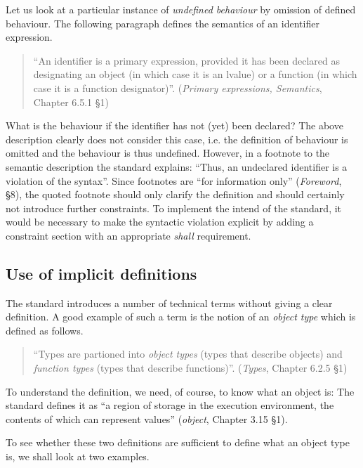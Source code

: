 \documentclass[12pt,a4paper,reqno]{article}
\theoremstyle{plain}
\theoremstyle{definition}
\begin{document}
Let us look at a particular instance of \textit{undefined behaviour} by omission of defined behaviour. The following paragraph defines the semantics of an identifier expression.
\begin{quote}
``An identifier is a primary expression, provided it has been declared as designating an object (in which case it is an lvalue) or a function (in which case it is a function designator)''. (\textit{Primary expressions, Semantics}, Chapter 6.5.1 §1)
\end{quote}
What is the behaviour if the identifier has not (yet) been declared? The above description clearly does not consider this case, i.e. the definition of behaviour is omitted and the behaviour is thus undefined. However, in a footnote to the semantic description the standard explains: ``Thus, an undeclared identifier is a violation of the syntax''. Since footnotes are ``for information only'' (\textit{Foreword}, §8), the quoted footnote should only clarify the definition and should certainly not introduce further constraints. To implement the intend of the standard, it would be necessary to make the syntactic violation explicit by adding a constraint section with an appropriate \textit{shall} requirement.

\subsection{Use of implicit definitions}
The standard introduces a number of technical terms without giving a clear definition. A good example of such a term is the notion of an \textit{object type} which is defined as follows.
\begin{quote}
``Types are partioned into \textit{object types} (types that describe objects) and \textit{function types} (types that describe functions)''. (\textit{Types}, Chapter 6.2.5 §1)
\end{quote}
To understand the definition, we need, of course, to know what an object is: The standard defines it as ``a region of storage in the execution environment, the contents of which can represent values'' (\textit{object}, Chapter 3.15 §1).

To see whether these two definitions are sufficient to define what an object type is, we shall look at two examples.
\end{document}
